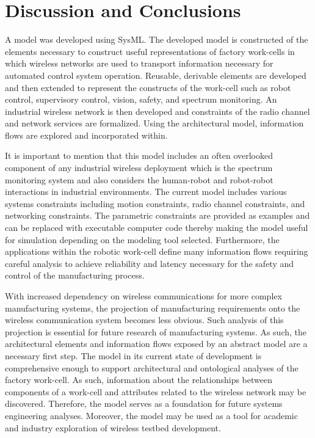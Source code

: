 \section{Discussion and Conclusions}\label{sysml:sec:conclusion}
A model was developed using SysML. The developed model is constructed of the elements necessary to construct useful representations of factory work-cells in which wireless networks are used to transport information necessary for automated control system operation.  Reusable, derivable elements are developed and then extended to represent the constructs of the work-cell such as robot control, supervisory control, vision, safety, and spectrum monitoring.  An industrial wireless network is then developed and constraints of the radio channel and network services are formalized. Using the architectural model, information flows are explored and incorporated within. 

It is important to mention that this model includes an often overlooked component of any industrial wireless deployment which is the spectrum monitoring system and also considers the human-robot and robot-robot interactions in industrial environments. The current model includes various systems constraints including motion constraints, radio channel constraints, and networking constraints. The parametric constraints are provided as examples and can be replaced with executable computer code thereby making the model useful for simulation depending on the modeling tool selected. Furthermore, the applications within the robotic work-cell define many information flows requiring careful analysis to achieve reliability and latency necessary for the safety and control of the manufacturing process.

With increased dependency on wireless communications for more complex manufacturing systems, the projection of manufacturing requirements onto the wireless communication system becomes less obvious. Such analysis of this projection is essential for future research of manufacturing systems. As such, the architectural elements and information flows exposed by an abstract model
are a necessary first step. The model in its current state of development is comprehensive enough to support architectural and ontological analyses of the factory work-cell.  As such, information about the relationships between components of a work-cell and attributes related to the wireless network may be discovered. Therefore, the model serves as a foundation for future systems engineering analyses. Moreover, the model may be used as a tool for academic and industry exploration of wireless testbed development.

%
%

